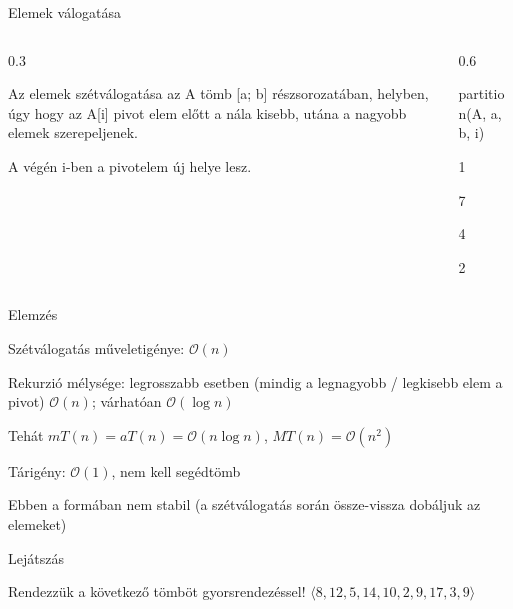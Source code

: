 \documentclass[hungarian]{beamer}
\newcommand{\Ord}{\mathcal{O}}
\begin{document}
\begin{frame}{Elemek válogatása}

\begin{columns}

\begin{column}{0.3\linewidth}

Az elemek szétválogatása az A tömb [a; b] részsorozatában, helyben, úgy hogy az A[i] pivot elem előtt a nála kisebb, utána a nagyobb elemek szerepeljenek.

A végén i-ben a pivotelem új helye lesz.

\end{column}

\begin{column}{0.6\linewidth}

\vspace{-12mm}

\begin{stukibox*}{partition(A, a, b, i)}
\begin{WHILE}{1}{}
\end{WHILE}
\begin{IF}[80]{7}{}
    \begin{WHILE}{4}{}
        \begin{IF}{2}{}
        \ELSE
        \end{IF}
    \end{WHILE}
\ELSE
\end{IF}
\end{stukibox*}

\end{column}

\end{columns}

\end{frame}

\begin{frame}{Elemzés}

Szétválogatás műveletigénye: $\Ord(n)$

Rekurzió mélysége: legrosszabb esetben (mindig a legnagyobb / legkisebb elem a pivot) $\Ord(n)$; várhatóan $\Ord(\log n)$

Tehát $mT(n) = aT(n) = \Ord(n \log n)$, $MT(n) = \Ord(n^2)$

Tárigény: $\Ord(1)$, nem kell segédtömb

Ebben a formában nem stabil (a szétválogatás során össze-vissza dobáljuk az elemeket)
    
\end{frame}

\begin{frame}[t]{Lejátszás}

Rendezzük a következő tömböt gyorsrendezéssel!
$\langle 8, 12, 5, 14, 10, 2, 9, 17, 3, 9 \rangle$


\end{frame}
\end{document}
